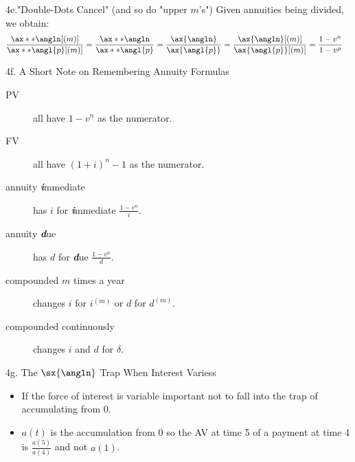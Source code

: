 \begin{CHPT_SUMM_AUTO}[label = {L.-4e}]{4e."Double-Dots Cancel" (and so do "upper $m$'s")}
Given annuities being divided, we obtain:
	\begin{align*}
	\frac{\ax**{\angln}[(m)]}{\ax**{\angl{p}}[(m)]}
	&=	\frac{\ax**{\angln}}{\ax**{\angl{p}}}
	=	\frac{\ax{\angln}}{\ax{\angl{p}}}
	=	\frac{\ax{\angln}[(m)]}{\ax{\angl{p}}[(m)]}	
	=	\frac{1 - v^{n}}{1 - v^{p}}
	\end{align*}
\end{CHPT_SUMM_AUTO}

\begin{CHPT_SUMM_AUTO}[label = {L.-4f}]{4f. A Short Note on Remembering Annuity Formulas}
\begin{description}
	\item[PV]	all have $1 - v^{n}$ as the numerator.
	\item[FV]	all have $(1 + i)^{n} - 1$ as the numerator.
	\item[annuity \textit{\textbf{i}}mmediate]	has $i$ for \textbf{\textit{i}}mmediate $\frac{1 - v^{n}}{i}$.
	\item[annuity \textit{\textbf{d}}ue]	has $d$ for \textbf{\textit{d}}ue  $\frac{1 - v^{n}}{d}$.
	\item[compounded $m$ times a year]	changes $i$ for $i^{(m)}$ or $d$ for $d^{(m)}$.
	\item[compounded continuously]	changes $i$ and $d$ for $\delta$.
\end{description}
\end{CHPT_SUMM_AUTO}

\begin{CHPT_SUMM_AUTO}[label = {L.-4g}]{4g. The $\sx{\angln}$ Trap When Interest Variess}
\begin{itemize}[leftmargin = *]
	\item	If the force of interest is variable important not to fall into the trap of accumulating from 0.
	\item	$a(t)$ is the accumulation from 0 so the AV at time 5 of a payment at time 4 is $\frac{a(5)}{a(4)}$ and not $a(1)$.
\end{itemize}
\end{CHPT_SUMM_AUTO}

